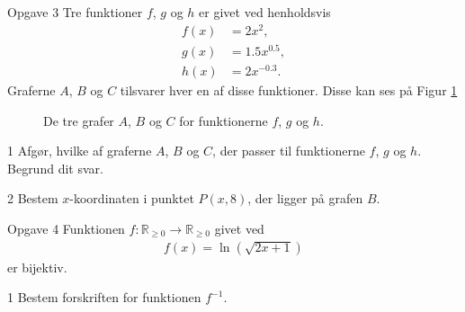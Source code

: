 \begin{opgavetekst}{Opgave 3}
	Tre funktioner $f$, $g$ og $h$ er givet ved henholdsvis
	\begin{align*}
		f(x) &= 2x^2, \\
		g(x) &= 1.5x^{0.5}, \\
		h(x) &= 2x^{-0.3}.
	\end{align*}
	Graferne $A$, $B$ og $C$ tilsvarer hver en af disse funktioner. Disse kan ses på Figur \ref{fig:potens}
	\begin{figure}[H]
		\centering
		\caption{De tre grafer $A$, $B$ og $C$ for funktionerne $f$, $g$ og $h$.}
		\label{fig:potens}
	\end{figure}
	\phantom{h}
\end{opgavetekst}
\begin{delopgave}{1}
	Afgør, hvilke af graferne $A$, $B$ og $C$, der passer til funktionerne $f$, $g$ og $h$. Begrund dit svar. 
\end{delopgave}
\begin{delopgave}{2}
	Bestem $x$-koordinaten i punktet $P(x,8)$, der ligger på grafen $B$. 
\end{delopgave}
%
%
%
%
%
\begin{opgavetekst}{Opgave 4}
	Funktionen $f:\mathbb{R}_{\geq 0} \to \mathbb{R}_{\geq 0}$ givet ved
	\begin{align*}
		f(x) = \ln(\sqrt{2x+1})
	\end{align*}
	er bijektiv. 
\end{opgavetekst}
\begin{delopgave}{1}
	Bestem forskriften for funktionen $f^{-1}$.
\end{delopgave}
%
%
%
%
%
